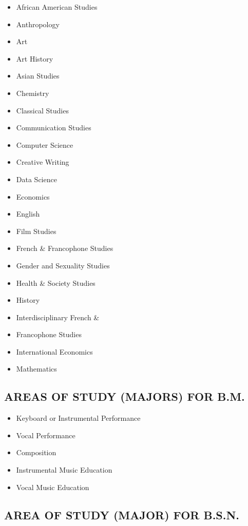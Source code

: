 \documentclass[
  letterpaper,
]{scrbook}
\providecommand{\tightlist}{%
  \setlength{\itemsep}{0pt}\setlength{\parskip}{0pt}}
\begin{document}
\begin{itemize}
\tightlist
\item
  African American Studies
\item
  Anthropology
\item
  Art
\item
  Art History
\item
  Asian Studies
\item
  Chemistry
\item
  Classical Studies
\item
  Communication Studies
\item
  Computer Science
\item
  Creative Writing
\item
  Data Science
\item
  Economics
\item
  English
\item
  Film Studies
\item
  French \& Francophone Studies
\item
  Gender and Sexuality Studies
\item
  Health \& Society Studies
\item
  History
\item
  Interdisciplinary French \&
\item
  Francophone Studies
\item
  International Economics
\item
  Mathematics
\end{itemize}

\hypertarget{areas-of-study-majors-for-b.m.}{%
\subsection{AREAS OF STUDY (MAJORS) FOR
B.M.}\label{areas-of-study-majors-for-b.m.}}

\begin{itemize}
\tightlist
\item
  Keyboard or Instrumental Performance
\item
  Vocal Performance
\item
  Composition
\item
  Instrumental Music Education
\item
  Vocal Music Education
\end{itemize}

\hypertarget{area-of-study-major-for-b.s.n.}{%
\subsection{AREA OF STUDY (MAJOR) FOR
B.S.N.}\label{area-of-study-major-for-b.s.n.}}
\end{document}
